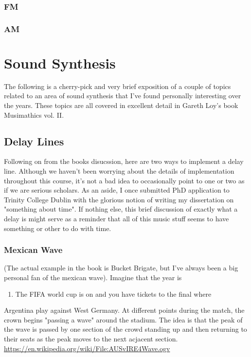 \documentclass[11pt]{article}
\begin{document}
\subsubsection{FM}
\label{sec:org2f92110}
\subsubsection{AM}
\label{sec:org1240494}



\section{Sound Synthesis}
\label{sec:orgb5c6a6f}

The following is a cherry-pick and very brief exposition of a couple
of topics related to an area of sound synthesis that I've found
personally interesting over the years. These topics are all covered in
excellent detail in Gareth Loy's book Musimathics vol. II. 

\subsection{Delay Lines}
\label{sec:org9acf961}
Following on from the books disucssion, here are two ways to implement
a delay line. Although we haven't been worrying about the details of
implementation throughout this course, it's not a bad idea to
occasionally point to one or two as if we are serious scholars. As an
aside, I once submitted PhD application to Trinity College Dublin with
the glorious notion of writing my dissertation on "something about
time". If nothing else, this brief discussion of exactly what a delay
is might serve as a reminder that all of this music stuff seems to
have something or other to do with time.

\subsubsection{Mexican Wave}
\label{sec:org7b9755e}
(The actual example in the book is Bucket Brigate, but I've always
been a big personal fan of the mexican wave). Imagine that the year is
\begin{enumerate}
\item The FIFA world cup is on and you have tickets to the final where
\end{enumerate}
Argentina play against West Germany. At different points during the
match, the crown begins "passing a wave" around the stadium. The idea
is that the peak of the wave is passed by one section of the crowd
standing up and then returning to their seats as the peak moves to the
next acjacent section.
\url{https://en.wikipedia.org/wiki/File:AUSvIRE4Wave.ogv}
\end{document}
